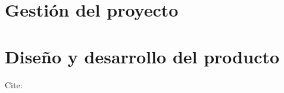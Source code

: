 \chapter{Gestión del proyecto}






\chapter{Diseño y desarrollo del producto}


Cite: \cite{Lorem}

